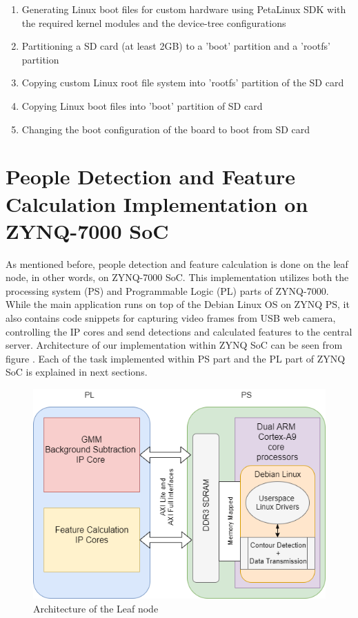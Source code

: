 \documentclass[12pt,a4paper]{report}
\begin{document}
\begin{enumerate}
\item Generating Linux boot files for custom hardware using PetaLinux SDK with the required kernel modules and the device-tree configurations
\item Partitioning a SD card (at least 2GB) to a 'boot' partition and a 'rootfs' partition
\item Copying custom Linux root file system into 'rootfs' partition of the SD card
\item Copying Linux boot files into 'boot' partition of SD card
\item Changing the boot configuration of the board to boot from SD card
\end{enumerate}

\section{People Detection and Feature Calculation Implementation on ZYNQ-7000 SoC}
As mentioned before, people detection and feature calculation is done on the leaf node, in other words, on ZYNQ-7000 SoC. This implementation utilizes both the processing system (PS) and Programmable Logic (PL) parts of ZYNQ-7000. While the main application runs on top of the Debian Linux OS on ZYNQ PS, it also contains code snippets for capturing video frames from USB web camera, controlling the IP cores and send detections and calculated features to the central server. Architecture of our implementation within ZYNQ SoC can be seen from figure . Each of the task implemented within PS part and the PL part of ZYNQ SoC is explained in next sections.

\begin{figure}[H]
\includegraphics[width=\textwidth]{hardware.png}
\centering
\caption{Architecture of the Leaf node}
\label{leafnode_Archi}
\end{figure}
\end{document}
